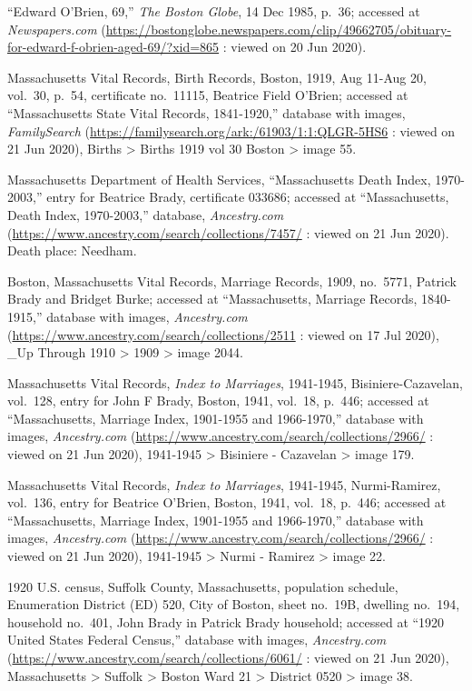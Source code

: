 \begin{thebibliography}{999}
	``Edward O'Brien, 69,'' \textit{The Boston Globe}, 14 Dec 1985, p.\ 36; accessed at \textit{Newspapers.com} (\url{https://bostonglobe.newspapers.com/clip/49662705/obituary-for-edward-f-obrien-aged-69/?xid=865} : viewed on 20 Jun 2020).
	
	Massachusetts Vital Records, Birth Records, Boston, 1919, Aug 11-Aug 20, vol.\ 30, p.\ 54, certificate no.\ 11115, Beatrice Field O'Brien; accessed at ``Massachusetts State Vital Records, 1841-1920,'' database with images, \textit{FamilySearch} (\url{https://familysearch.org/ark:/61903/1:1:QLGR-5HS6} : viewed on 21 Jun 2020), Births > Births 1919 vol 30 Boston > image 55.
	
	Massachusetts Department of Health Services, ``Massachusetts Death Index, 1970-2003,'' entry for Beatrice Brady, certificate 033686; accessed at ``Massachusetts, Death Index, 1970-2003,'' database, \textit{Ancestry.com} (\url{https://www.ancestry.com/search/collections/7457/} : viewed on 21 Jun 2020).\\
	Death place: Needham.
	
	Boston, Massachusetts Vital Records, Marriage Records, 1909, no.\ 5771, Patrick Brady and Bridget Burke; accessed at ``Massachusetts, Marriage Records, 1840-1915,'' database with images, \textit{Ancestry.com} (\url{https://www.ancestry.com/search/collections/2511} : viewed on 17 Jul 2020), \_Up Through 1910 > 1909 > image 2044.
	
	Massachusetts Vital Records, \textit{Index to Marriages}, 1941-1945, Bisiniere-Cazavelan, vol.\ 128, entry for John F Brady, Boston, 1941, vol.\ 18, p.\ 446; accessed at ``Massachusetts, Marriage Index, 1901-1955 and 1966-1970,'' database with images, \textit{Ancestry.com} (\url{https://www.ancestry.com/search/collections/2966/} : viewed on 21 Jun 2020), 1941-1945 > Bisiniere - Cazavelan > image 179.
	
	Massachusetts Vital Records, \textit{Index to Marriages}, 1941-1945, Nurmi-Ramirez, vol.\ 136, entry for Beatrice O'Brien, Boston, 1941, vol.\ 18, p.\ 446; accessed at ``Massachusetts, Marriage Index, 1901-1955 and 1966-1970,'' database with images, \textit{Ancestry.com} (\url{https://www.ancestry.com/search/collections/2966/} : viewed on 21 Jun 2020), 1941-1945 > Nurmi - Ramirez > image 22.
	
	1920 U.S. census, Suffolk County, Massachusetts, population schedule, Enumeration District (ED) 520, City of Boston, sheet no.\ 19B, dwelling no.\ 194, household no.\ 401, John Brady in Patrick Brady household; accessed at ``1920 United States Federal Census,'' database with images, \textit{Ancestry.com} (\url{https://www.ancestry.com/search/collections/6061/} : viewed on 21 Jun 2020), Massachusetts > Suffolk > Boston Ward 21 > District 0520 > image 38.
	

\end{thebibliography}
